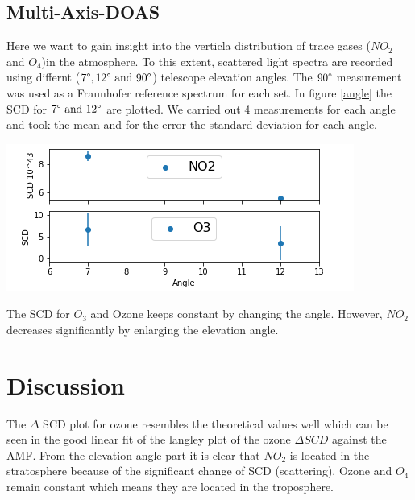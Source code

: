 \documentclass[12pt, english]{scrartcl} %
\newenvironment{Figure}
  {\par\medskip\noindent\minipage{\linewidth}}
  {\endminipage\par\medskip}
\begin{document}
\begin{multicols}{2}
\subsection{Multi-Axis-DOAS}
Here we want to gain insight into the verticla distribution of trace gases ($NO_2$ and $O_4$)in the atmosphere. To this extent, scattered light spectra are recorded using differnt ($7 \degree, 12 \degree \text{\ and\ } 90 \degree$) telescope elevation angles. The $90 \degree$ measurement was used as a Fraunhofer reference spectrum for each set. In figure \ref{angle} the SCD for $7 \degree \text{\ and\ } 12 \degree$ are plotted. We carried out 4 measurements for each angle and took the mean and for the error the standard deviation for each angle. 
\begin{Figure}
 \centering
 \captionsetup{format=plain}
 \includegraphics[width=\linewidth]{graphics/anglescd2.png}
  \label{angle}
\end{Figure}
The SCD for $O_3$ and Ozone keeps constant by changing the angle. However, $NO_2$ decreases significantly by enlarging the elevation angle.
\section{Discussion}
The $\Delta$ SCD plot for ozone resembles the theoretical values well which can be seen in the good linear fit of the langley plot of the ozone $\Delta SCD$ against the AMF. 
From the elevation angle part it is clear that $NO_2$ is located in the stratosphere because of the significant change of SCD (scattering). Ozone and $O_4$ remain constant which means they are located in the troposphere. 
\end{multicols}
\end{document}
